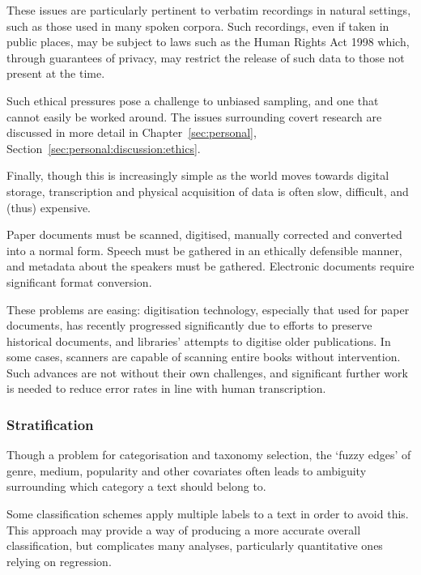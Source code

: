 These issues are particularly pertinent to verbatim recordings in natural settings, such as those used in many spoken corpora.  Such recordings, even if taken in public places, may be subject to laws such as the Human Rights Act 1998 which, through guarantees of privacy, may restrict the release of such data to those not present at the time.

Such ethical pressures pose a challenge to unbiased sampling, and one that cannot easily be worked around.  The issues surrounding covert research are discussed in more detail in Chapter~\ref{sec:personal}, Section~\ref{sec:personal:discussion:ethics}.

Finally, though this is increasingly simple as the world moves towards digital storage, transcription and physical acquisition of data is often slow, difficult, and (thus) expensive.

Paper documents must be scanned, digitised, manually corrected and converted into a normal form. Speech must be gathered in an ethically defensible manner, and metadata about the speakers must be gathered.  Electronic documents require significant format conversion.

These problems are easing: digitisation technology, especially that used for paper documents, has recently progressed significantly due to efforts to preserve historical documents, and libraries' attempts to digitise older publications. In some cases, scanners are capable of scanning entire books without intervention.  Such advances are not without their own challenges, and significant further work is needed to reduce error rates in line with human transcription\cite{ameliajoulainjay2015,alex2012digitised,6065393}.%








\subsubsection{Stratification}
Though a problem for categorisation and taxonomy selection, the `fuzzy edges' of genre, medium, popularity and other covariates often leads to ambiguity surrounding which category a text should belong to.

Some classification schemes apply multiple labels to a text in order to avoid this\cite{sharoffs2015}.  This approach may provide a way of producing a more accurate overall classification, but complicates many analyses, particularly quantitative ones relying on regression.

